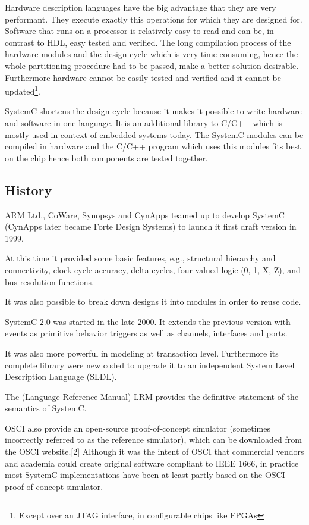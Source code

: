 \documentclass{article}
\begin{document}
	Hardware description languages have the big advantage that they are very performant.
	They execute exactly this operations for which they are designed for.	
	Software that runs on a processor is relatively easy to read and can be, in contrast to HDL, easy  tested and verified.	
	The long compilation process of the hardware modules and the design cycle which is very time consuming, hence the whole partitioning procedure had to be passed, make a better solution desirable.
	Furthermore hardware cannot be easily tested and verified and it cannot be updated\footnote{Except over an JTAG interface, in configurable chips like FPGAs}.
	
	SystemC shortens the design cycle because it makes it possible to write hardware and software in one language.
	It is an additional library to C/C++ which is mostly used in context of embedded systems today.
	The SystemC modules can be compiled in hardware and the C/C++ program which uses this modules fits best on the chip hence both components are tested together.
	  \subsection{History}
	  ARM Ltd., CoWare, Synopsys and CynApps teamed up to develop SystemC (CynApps later became Forte Design Systems) to launch it first draft version in 1999.
	  
	   At this time it provided some basic features, e.g., structural hierarchy and connectivity, clock-cycle accuracy, delta cycles, four-valued logic (0, 1, X, Z), and bus-resolution functions.
		
	    It was also possible to break down designs it into modules in order to reuse code.
	    
	    SystemC 2.0 was started in the late 2000. It extends the previous version with events as primitive behavior triggers as well as channels, interfaces and ports.
		
	    It was also more powerful in modeling at transaction level.
	    Furthermore its complete library were new coded to upgrade it to an independent System Level Description Language (SLDL).
		
		 The (Language Reference Manual) LRM provides the definitive statement of the semantics of SystemC.
		 
		 OSCI also provide an open-source proof-of-concept simulator (sometimes incorrectly referred to as the reference simulator), which can be downloaded from the OSCI website.[2] Although it was the intent of OSCI that commercial vendors and academia could create original software compliant to IEEE 1666, in practice most SystemC implementations have been at least partly based on the OSCI proof-of-concept simulator.
		 
\end{document}
